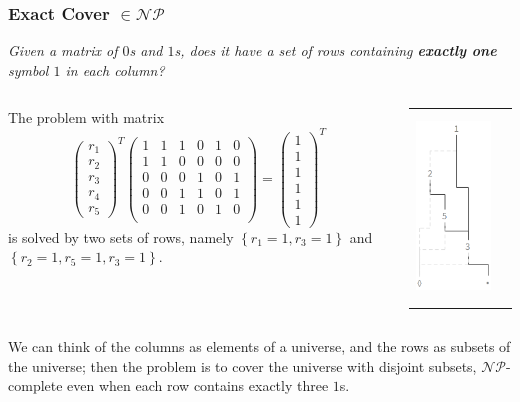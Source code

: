\documentclass[10pt]{beamer}
\begin{document}
\begin{frame}[fragile]
\frametitle{Exact Cover $\in \mathcal{NP}$}
\emph{Given a matrix of $0$s and $1$s, does it have a set of rows containing \textbf{exactly one} symbol $1$ in each column?}
\begin{columns}
     \begin{column}{.7\linewidth}
      The problem with matrix
      \begin{displaymath}
        \left(\begin{array}{c}
          r_{1} \\ r_{2} \\ r_{3} \\ r_{4} \\ r_{5}
        \end{array}\right)^{T}
        \left(\begin{array}{cccccc}
          1 & 1 & 1 & 0 & 1 & 0 \\
          1 & 1 & 0 & 0 & 0 & 0 \\
          0 & 0 & 0 & 1 & 0 & 1 \\
          0 & 0 & 1 & 1 & 0 & 1 \\
          0 & 0 & 1 & 0 & 1 & 0 \\
        \end{array}\right) = 
        \left(\begin{array}{c}
          1 \\ 1 \\ 1 \\ 1 \\ 1 \\ 1
        \end{array}\right)^{T}
      \end{displaymath}
      is solved by two sets of rows, namely 
      $\left\lbrace r_{1}=1, r_{3}=1\right\rbrace$ and
      $\left\lbrace r_{2}=1, r_{5}=1, r_{3}=1\right\rbrace$.
     \end{column}
     \begin{column}{.3\linewidth}
       \begin{tabular}{cc}
          \includegraphics[width=3cm,height=5cm]{ZDD.png}
       \end{tabular}
     \end{column}
   \end{columns}
We can think of the columns as elements of a universe, and the rows as subsets of the universe; 
then the problem is to cover the universe with disjoint subsets, $\mathcal{NP}$-complete even 
when each row contains exactly three $1$s.
\end{frame}
\end{document}
